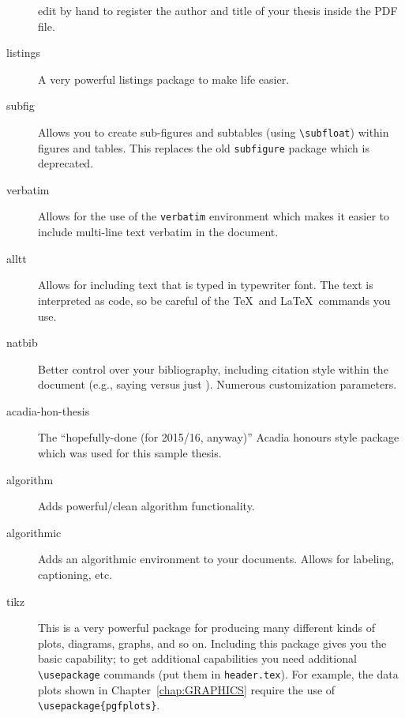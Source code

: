 \begin{description}
      edit by hand to register the author and title of your thesis
      inside the PDF file.
    \item[listings] A very powerful listings package to make life easier.
    \item[subfig] Allows you to create sub-figures and subtables (using
    \verb|\subfloat|) within figures and tables.  This replaces the old
    \verb|subfigure| package which is deprecated.
    \item[verbatim] Allows for the use of the \verb|verbatim| environment
    which makes it easier to include multi-line text verbatim in the
    document.
    \item[alltt] Allows for including text that is typed in typewriter
    font. The text is interpreted as code, so be careful of the \TeX\ and 
    \LaTeX\ commands you use.
    \item[natbib] Better control over your bibliography, including
    citation style within the document (e.g., saying \citet{1188581}
    versus just \citep{1188581}).  Numerous customization parameters. 
    \item[acadia-hon-thesis] The ``hopefully-done (for 2015/16,
      anyway)'' Acadia honours style package which was used for this
      sample thesis.
    \item[algorithm] Adds powerful/clean algorithm functionality. 
    \item[algorithmic] Adds an algorithmic environment to your
    documents.  Allows for labeling, captioning, etc.
    \item[tikz] This is a very powerful package for producing many
    different kinds of plots, diagrams, graphs, and so on.  Including
    this package gives you the basic capability; to get additional
    capabilities you need additional \verb|\usepackage| commands (put
    them in \verb|header.tex|).  For example, the data plots shown in
    Chapter~\ref{chap:GRAPHICS} require the use of
    \verb|\usepackage{pgfplots}|.
\end{description}
